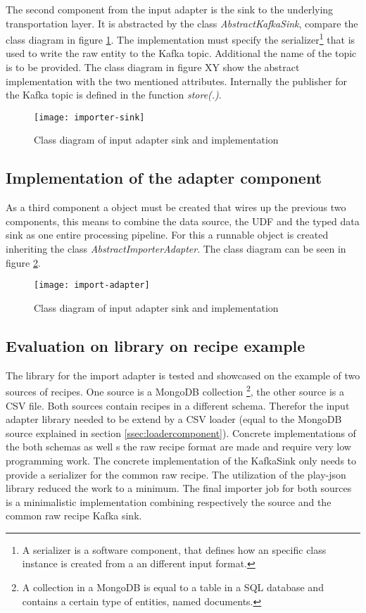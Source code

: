 The second component from the input adapter is the sink to the underlying transportation layer. It is abstracted by the class \textit{AbstractKafkaSink}, compare the class diagram in figure \ref{fig:importer-sink}. The implementation must specify the serializer\footnote{A serializer is a software component, that defines how an specific class instance is created from a an different input format.} that is used to write the raw entity to the Kafka topic. Additional the name of the topic is to be provided. The class diagram in figure XY show the abstract implementation with the two mentioned attributes. Internally the publisher for the Kafka topic is defined in the function \textit{store(.)}.

\begin{figure}[htb]
  \centering
  \texttt{[image: importer-sink]}\\
  \caption{Class diagram of input adapter sink and implementation}
  \label{fig:importer-sink}
\end{figure}

\subsection{Implementation of the adapter component}

As a third component a object must be created that wires up the previous two components, this means to combine the data source, the UDF and the typed data sink as one entire processing pipeline. For this a runnable object is created inheriting the class \textit{AbstractImporterAdapter}. The class diagram can be seen in figure \ref{fig:import-adapter}.  

\begin{figure}[htb]
  \centering
  \texttt{[image: import-adapter]}\\
  \caption{Class diagram of input adapter sink and implementation}
  \label{fig:import-adapter}
\end{figure}

\subsection{Evaluation on library on recipe example}
The library for the import adapter is tested and showcased on the example of two sources of recipes. One source is a MongoDB collection \footnote{A collection in a MongoDB is equal to a table in a SQL database and contains a certain type of entities, named documents.}, the other source is a CSV file. Both sources contain recipes in a different schema. Therefor the input adapter library needed to be extend by a CSV loader (equal to the MongoDB source explained in section \ref{ssec:loadercomponent}). Concrete implementations of the both schemas as well s the raw recipe format are made and require very low programming work. The concrete implementation of the KafkaSink only needs to provide a serializer for the common raw recipe. The utilization of the play-json library reduced the work to a minimum. The final importer job for both sources is a minimalistic implementation combining respectively the source and the common raw recipe Kafka sink.

